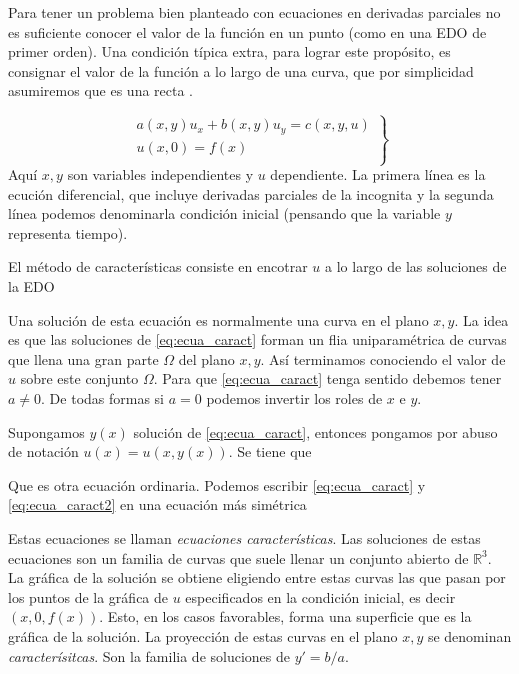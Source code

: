 Para tener un problema bien planteado con  ecuaciones en derivadas parciales no es suficiente conocer el valor de la función en un punto (como en una EDO de primer orden). Una condición típica extra, para lograr este propósito,  es consignar el valor de la función a lo largo de una curva, que por simplicidad asumiremos que es una recta .

\begin{ejemplo}
\begin{equation}\label{eq:EDP_gral_1orden}
  \left.\begin{array}{l}
  a(x,y)u_x+b(x,y)u_y=c(x,y,u)\\
  u(x,0)=f(x)\\
\end{array}\right\}
\end{equation}
Aquí $x,y$ son variables independientes y $u$ dependiente. La primera línea es la ecución diferencial, que incluye derivadas parciales de la incognita y la segunda línea podemos denominarla condición inicial (pensando que la variable $y$ representa tiempo).
\end{ejemplo}

El método de características consiste en encotrar $u$ a lo largo de las soluciones de la EDO


Una solución de esta ecuación es normalmente una curva en el plano  $x,y$. La idea es que las soluciones de \eqref{eq:ecua_caract} forman un flia uniparamétrica
 de curvas que llena una gran parte $\Omega$ del plano $x,y$.  Así terminamos conociendo el valor de $u$ sobre este conjunto $\Omega$. Para que \eqref{eq:ecua_caract} tenga sentido debemos tener $a\neq 0$. De todas formas si $a=0$ podemos invertir los roles de $x$ e $y$.

Supongamos $y(x)$ solución de \eqref{eq:ecua_caract}, entonces pongamos por abuso de notación $u(x)=u(x,y(x))$. Se tiene que

Que es otra ecuación ordinaria. Podemos escribir  \eqref{eq:ecua_caract} y \eqref{eq:ecua_caract2} en una ecuación más simétrica

Estas ecuaciones se llaman \emph{ecuaciones características}. Las soluciones de estas ecuaciones son un familia de curvas que suele llenar un conjunto abierto de  $\mathbb{R}^3$.  La gráfica de la solución se obtiene eligiendo entre estas curvas las que pasan por los puntos de la gráfica de $u$ especificados en la condición inicial, es decir $(x,0,f(x))$. Esto, en los casos favorables, forma una superficie que es la gráfica de la solución. La proyección de estas curvas en el plano $x,y$ se denominan \emph{caracterísitcas}. Son la familia de soluciones de $y'=b/a$.



